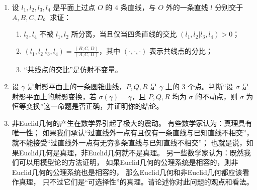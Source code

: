 \begin{enumerate}
    \item 设 $l_{1},l_{2},l_{3},l_{4}$ 是平面上过点 $O$ 的 $4$ 条直线，与 $O$ 外的一条直线 $l$ 分别交于 $A,B,C,D$。求证：
    \begin{enumerate}
        \item[(a)] $l_{3},l_{4}$ 不被 $l_{1},l_{2}$ 所分离，当且仅当四条直线的交比 $(l_{1},l_{2}|l_{3},l_{4})>0$；
        \item[(b)] $(l_{1},l_{2}|l_{3},l_{4})=\frac{(B,C,D)}{(A,C,D)}$，其中 $(\cdot,\cdot,\cdot)$ 表示共线点的分比；
        \item[(c)] “共线点的交比”是仿射不变量。
    \end{enumerate}

    \item 设 $\gamma$ 是射影平面上的一条圆锥曲线，$P,Q,R$ 是 $\gamma$ 上的 $3$ 个点。判断“设 $\sigma$ 是射影平面上的射影变换，若 $\sigma(\gamma)=\gamma$，且 $P,Q,R$ 均为 $\sigma$ 的不动点，则 $\sigma$ 为恒等变换”这一命题是否正确，并证明你的结论。

    \item 非Euclid几何的产生在数学界引起了极大的震动。
    有些数学家认为：真理具有唯一性；
    如果我们承认``过直线外一点有且仅有一条直线与已知直线不相交''，
    就不能接受``过直线外一点有无穷多条直线与已知直线不相交''；
    也就是说，如果Euclid几何是真理，非Euclid几何就不是真理。
    另一些数学家认为：既然我们可以用模型论的方法证明，
    如果Euclid几何的公理系统是相容的，则非Euclid几何的公理系统也是相容的，
    那么Euclid几何和非Euclid几何都应该看作真理，
    只不过它们是``可选择性''的真理。请论述你对此问题的观点和看法。
\end{enumerate}
~\\





\begin{center}

\end{center}

